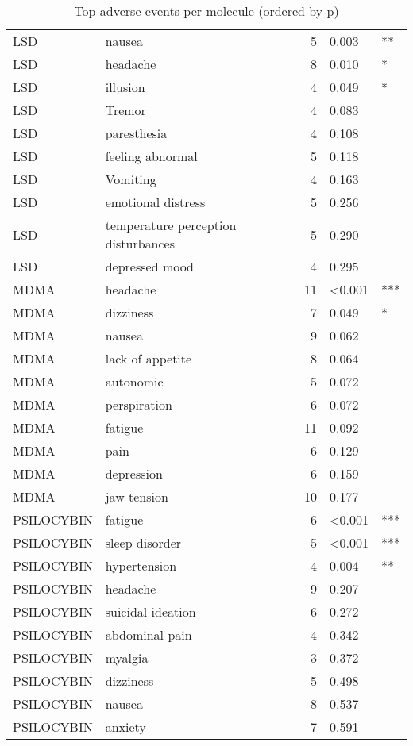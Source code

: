 \begin{table}[!h]
\centering
\caption{Top adverse events per molecule (ordered by p)}
\centering
\begin{tabular}[t]{llrll}
\toprule
LSD & nausea & 5 & 0.003 & **\\
LSD & headache & 8 & 0.010 & *\\
LSD & illusion & 4 & 0.049 & *\\
LSD & Tremor & 4 & 0.083 & \\
LSD & paresthesia & 4 & 0.108 & \\
\addlinespace
LSD & feeling abnormal & 5 & 0.118 & \\
LSD & Vomiting & 4 & 0.163 & \\
LSD & emotional distress & 5 & 0.256 & \\
LSD & temperature perception disturbances & 5 & 0.290 & \\
LSD & depressed mood & 4 & 0.295 & \\
\addlinespace
MDMA & headache & 11 & <0.001 & ***\\
MDMA & dizziness & 7 & 0.049 & *\\
MDMA & nausea & 9 & 0.062 & \\
MDMA & lack of appetite & 8 & 0.064 & \\
MDMA & autonomic & 5 & 0.072 & \\
\addlinespace
MDMA & perspiration & 6 & 0.072 & \\
MDMA & fatigue & 11 & 0.092 & \\
MDMA & pain & 6 & 0.129 & \\
MDMA & depression & 6 & 0.159 & \\
MDMA & jaw tension & 10 & 0.177 & \\
\addlinespace
PSILOCYBIN & fatigue & 6 & <0.001 & ***\\
PSILOCYBIN & sleep disorder & 5 & <0.001 & ***\\
PSILOCYBIN & hypertension & 4 & 0.004 & **\\
PSILOCYBIN & headache & 9 & 0.207 & \\
PSILOCYBIN & suicidal ideation & 6 & 0.272 & \\
\addlinespace
PSILOCYBIN & abdominal pain & 4 & 0.342 & \\
PSILOCYBIN & myalgia & 3 & 0.372 & \\
PSILOCYBIN & dizziness & 5 & 0.498 & \\
PSILOCYBIN & nausea & 8 & 0.537 & \\
PSILOCYBIN & anxiety & 7 & 0.591 & \\
\bottomrule
\end{tabular}
\end{table}
